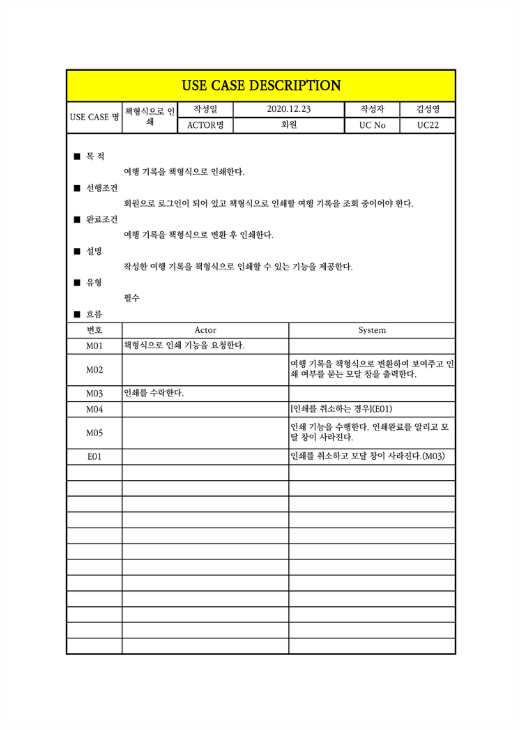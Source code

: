 {{{{{{{{{{{{{{{{{{{{{{{{\includegraphics[width=1.1\textwidth]{./Figure/Design/Display/usecase/022.pdf} \\
}}}}}}}}}}}}}}}}}}}}}}}}
